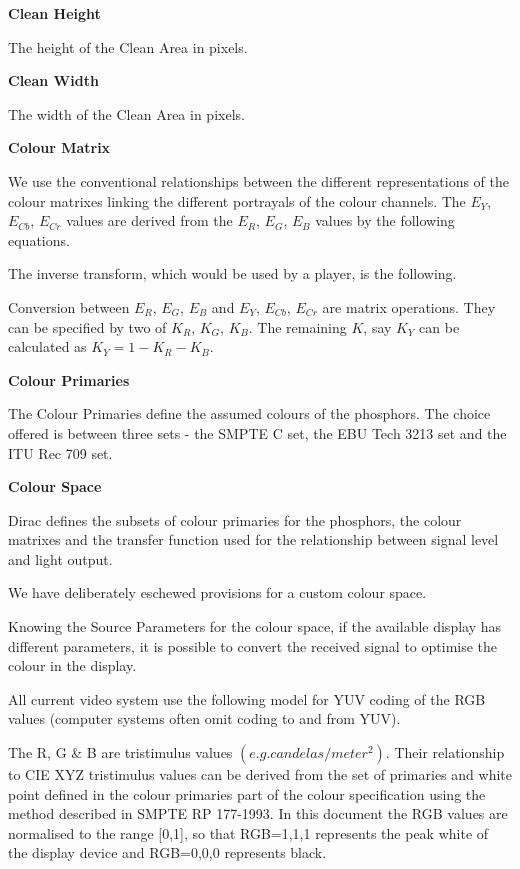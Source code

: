 \textbf{Clean Height}

The height of the Clean Area in pixels.

\textbf{Clean Width}

The width of the Clean Area in pixels.

\textbf{Colour Matrix}

We use the conventional relationships between the different
representations of the colour matrixes linking the different portrayals
of the colour channels. The $E_{Y}$, $E_{Cb}$, $E_{Cr}$ values are
derived from the $E_R$, $E_G$, $E_B$ values by the following equations.


The inverse transform, which would be used by a player, is the following.

Conversion between $E_R$, $E_G$, $E_B$ and $E_Y$, $E_{Cb}$, $E_{Cr}$ are
matrix operations. They can be specified by two of $K_R$, $K_G$, $K_B$.
The remaining $K$, say $K_Y$ can be calculated as $K_Y=1- K_R - K_B$.

\textbf{Colour Primaries}

The Colour Primaries define the assumed colours of the phosphors. The
choice offered is between three sets - the SMPTE C set, the EBU Tech
3213 set and the ITU Rec 709 set.

\textbf{Colour Space}

Dirac defines the subsets of colour primaries for the phosphors, the
colour matrixes and the transfer function used for the relationship
between signal level and light output.

We have deliberately eschewed provisions for a custom colour space.

Knowing the Source Parameters for the colour space, if the available
display has different parameters, it is possible to convert the received
signal to optimise the colour in the display.

All current video system use the following model for YUV coding of the
RGB values (computer systems often omit coding to and from YUV).

The R, G \& B are tristimulus values $(e.g. candelas/meter^{2})$. Their
relationship to CIE XYZ tristimulus values can be derived from the set
of primaries and white point defined in the colour primaries part of the
colour specification using the method described in SMPTE RP 177-1993. In
this document the RGB values are normalised to the range [0,1], so that
RGB=1,1,1 represents the peak white of the display device and RGB=0,0,0
represents black.

